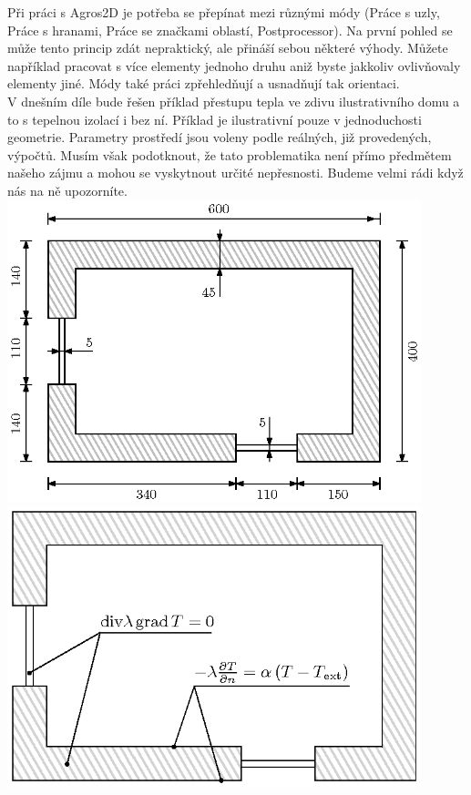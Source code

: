 \documentclass[a4paper, oneside]{article}
\begin{document}
Při práci s Agros2D je potřeba se přepínat mezi různými módy (Práce s uzly, Práce s hranami, Práce se značkami oblastí, Postprocessor). Na první pohled se může tento princip zdát nepraktický, ale přináší sebou některé výhody. Můžete například pracovat s více elementy jednoho druhu aniž byste jakkoliv ovlivňovaly elementy jiné. Módy také práci zpřehledňují a usnadňují tak orientaci.\\
V dnešním díle bude řešen příklad přestupu tepla ve zdivu ilustrativního domu a to s tepelnou izolací i bez ní. Příklad je ilustrativní pouze v jednoduchosti geometrie. Parametry prostředí jsou voleny podle reálných, již provedených, výpočtů. Musím však podotknout, že tato problematika není přímo předmětem našeho zájmu a mohou se vyskytnout určité nepřesnosti. Budeme velmi rádi když nás na ně upozorníte.\\
\includegraphics[width=12cm]{nakres.eps}\\
\includegraphics[width=12cm]{matematicky_model.eps}\\
\end{document}
